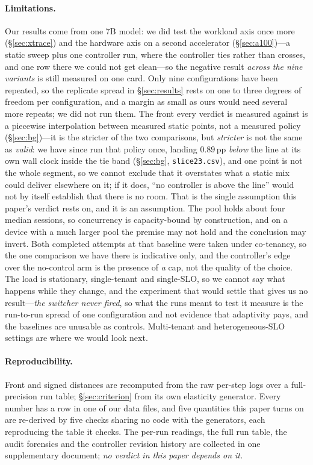 \paragraph{Limitations.} Our results come from one 7B model: we did test the
workload axis once more (\S\ref{sec:xtrace}) and the hardware axis on a second
accelerator (\S\ref{sec:a100})---a static sweep plus one controller run, where the
controller ties rather than crosses, and one row there we could not get clean---so
the negative result \emph{across the nine \sys{} variants} is still measured on
one card. Only nine configurations have been repeated, so the replicate spread in
\S\ref{sec:results} rests on one to three degrees of freedom per configuration,
and a margin as small as ours would need several more repeats; we did not run
them. The front every verdict is measured against is a piecewise interpolation
between measured static points, not a measured policy (\S\ref{sec:bg})---it is
the stricter of the
two comparisons, but \emph{stricter} is not the same as \emph{valid}: we have
since run that policy once, landing $0.89$\,pp \emph{below} the line at its own
wall clock inside the tie band (\S\ref{sec:bg}, \texttt{slice23.csv}), and one
point is not the whole segment, so we cannot exclude that it overstates what a
static mix could deliver elsewhere on it; if it does, ``no controller is above the
line'' would not by itself establish that there is no room. That is the single
assumption this paper's verdict rests on, and it is an assumption. The pool
holds about four median sessions, so concurrency is capacity-bound by
construction, and on a device with a much larger pool the premise may not hold and
the conclusion may invert. Both completed attempts at that baseline were taken
under co-tenancy, so the one comparison we have there is indicative only, and the
controller's edge over the no-control arm is the presence of \emph{a} cap, not the
quality of the choice. The load is stationary, single-tenant and single-SLO, so we
cannot say what happens while they change, and the experiment that would settle
that gives us no result---\emph{the switcher never fired}, so what the runs meant to test it
measure is the run-to-run spread of one configuration and not evidence that
adaptivity pays, and the baselines are unusable as controls. Multi-tenant and
heterogeneous-SLO settings are where we would look next.

\paragraph{Reproducibility.}
Front and signed distances are recomputed from the raw per-step logs over a
full-precision run table; \S\ref{sec:criterion} from its own elasticity
generator. Every number has a row in one of our data files, and five quantities
this paper turns on are re-derived by five checks sharing no code with the
generators, each reproducing the table it checks. The per-run readings, the full run
table, the audit forensics and the controller revision history are collected in
one supplementary document; \emph{no verdict in this paper depends on it.}

